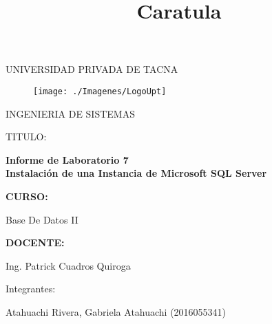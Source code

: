 \documentclass[12pt, letterpaper]{article}
\begin{document}
\title{Caratula}

\begin{titlepage}
	\begin{center}
		\large{UNIVERSIDAD PRIVADA DE TACNA}\\

		\vspace*{-0.025in}
			\begin{figure}[htb]
				\begin{center}
					\texttt{[image: ./Imagenes/LogoUpt]}
				\end{center}
			\end{figure}

		\vspace*{0.15in}
		INGENIERIA DE SISTEMAS  \\

		\vspace*{0.5in}
			\begin{large}
			TITULO:\\
			\end{large}

		\vspace*{0.1in}
			\begin{large}
				\textbf{Informe de Laboratorio 7} \\
				\textbf{Instalación de una Instancia de Microsoft SQL Server} \\
			\end{large}

		\vspace*{0.3in}
			\begin{large}
				\textbf{CURSO:} \\
			\end{large}

		\vspace*{0.1in}
			\begin{large}
				Base De Datos II \\
			\end{large}

		\vspace*{0.3in}
			\begin{large}
				\textbf{DOCENTE:} \\
			\end{large}

		\vspace*{0.1in}
			\begin{large}
				Ing. Patrick Cuadros Quiroga \\
			\end{large}

		\vspace*{0.2in}
			\vspace*{0.1in}
				\begin{large}
					Integrantes: \\
					\begin{flushleft}
						Atahuachi Rivera, Gabriela Atahuachi	\hfill	(2016055341) \\
					\end{flushleft}
				\end{large}
	\end{center}
\end{titlepage}
\end{document}
